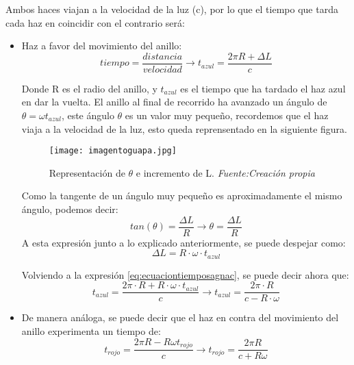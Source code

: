 Ambos haces viajan a la velocidad de la luz (c), por lo que el tiempo que tarda cada haz en coincidir con el contrario será:

\begin{itemize}
    \item Haz a favor del movimiento del anillo:    
    \begin{equation}
 	tiempo = \frac{distancia}{velocidad} \rightarrow    t_{azul} = \frac{2 \pi R + \Delta L}{c}
 	\label{eq:ecuaciontiemposagnac}
    \end{equation}
    
Donde R es el radio del anillo, y \(t_{azul}\) es el tiempo que ha tardado el haz azul en dar la vuelta. El anillo al final de recorrido ha avanzado un ángulo de \(\theta = \omega t_{azul}\), este ángulo \(\theta\) es un valor muy pequeño, recordemos que el haz viaja a la velocidad de la luz, esto queda reprensentado en la siguiente figura.
    
\begin{figure}[H]
    \centering
    \texttt{[image: imagentoguapa.jpg]}
    \caption{\centering Representación de \(\theta\) e incremento de L.\textit{ Fuente:Creación propia}}
    \label{fig:imahenoguapo}
\end{figure} 
    
Como la tangente de un ángulo muy pequeño es aproximadamente el mismo ángulo, podemos decir:
    \[
    	tan(\theta ) = \frac{\Delta L}{R} \rightarrow \theta = \frac{\Delta L}{R}
     \]
 A esta expresión junto a lo explicado anteriormente, se puede despejar como:    
    \[
    \Delta L = R \cdot \omega \cdot t_{azul}
    \]
    
  Volviendo a la expresión \ref{eq:ecuaciontiemposagnac}, se puede decir ahora que:    
    \begin{equation}
    t_{azul} = \frac{2 \pi \cdot R + R \cdot \omega \cdot t_{azul}}{c} \rightarrow t_{azul} = \frac{2 \pi \cdot R}{c - R \cdot \omega}
    \end{equation}
    
    \item De manera análoga, se puede decir que el haz en contra del movimiento del anillo experimenta un tiempo de:   
    \begin{equation}
    t_{rojo} = \frac{2 \pi R - R \omega t_{rojo}}{c} \rightarrow t_{rojo} = \frac{2 \pi R}{c + R \omega}
    \end{equation}
\end{itemize}

